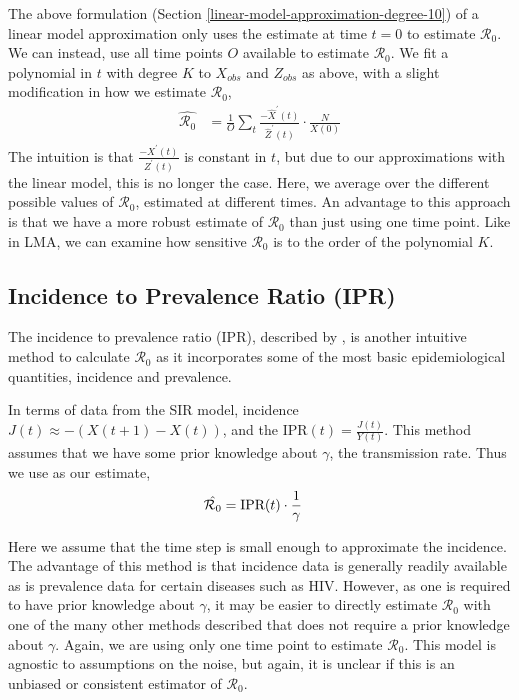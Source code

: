 \documentclass[12pt]{article}
\newcommand{\rr}{\ensuremath{\mathcal{R}_0}}
\begin{document}
The above formulation (Section \ref{linear-model-approximation-degree-10}) of a linear model approximation only uses the estimate at time $t=0$ to estimate $\rr$.  We can instead, use all time points $O$ available to estimate $\rr$.  We fit a polynomial in \(t\) with degree \(K\) to \(X_{obs}\)
and \(Z_{obs}\) as above, with a slight modification in how we estimate
\(\rr\),
\begin{align*}
  \hat{\rr} &= \frac{1}{O} \sum_t \frac{-\hat{X}^\prime(t)}{\hat{Z}^\prime(t)} \cdot \frac{N}{X(0)} 
\end{align*}
The intuition is that $\frac{-X^\prime(t)}{Z^\prime(t)}$ is constant in $t$, but due to our approximations with the linear model, this is no longer the case.  Here, we average over the different possible values of $\rr$, estimated at different times.  An advantage to this approach is that we have a more robust estimate of $\rr$ than just using one time point.  Like in LMA, we can examine how sensitive $\rr$ is to the order of the polynomial $K$.


\subsection{Incidence to Prevalence Ratio (IPR)}\label{incidence-to-prevalence-ratio}
The incidence to prevalence ratio (IPR), described by \cite{Nishiura2009}, is another intuitive method to calculate $\rr$ as it incorporates some of the most basic epidemiological quantities, incidence and prevalence.

In terms of data from the SIR model, incidence $J(t) \approx -(X(t+1) - X(t))$, and the IPR$(t) = \frac{J(t)}{Y(t)}$.  This method assumes that we have some prior knowledge about $\gamma$, the transmission rate.  Thus we use as our estimate,
\begin{align*}
\hat{\rr} &= \textnormal{IPR}(t) \cdot \frac{1}{\gamma}
\end{align*}

Here we assume that the time step is small enough to approximate the incidence.  The advantage of this method is that incidence data is generally readily available as is prevalence data for certain diseases such as HIV.  However, as one is required to have prior knowledge about $\gamma$, it may be easier to directly estimate $\rr$ with one of the many other methods described that does not require a prior knowledge about $\gamma$.  Again, we are using only one time point to estimate $\rr$.  This model is agnostic to assumptions on the noise, but again, it is unclear if this is an unbiased or consistent estimator of $\rr$.
\end{document}
